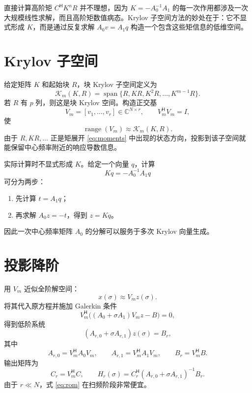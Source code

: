 \documentclass[UTF8,a4paper,11pt]{ctexart}
\newcommand{\CC}{\mathbb{C}}
\newcommand{\cK}{\mathcal{K}}
\newcommand{\herm}{\mathsf{H}}
\begin{document}
直接计算高阶矩 $C^{\herm}K^nR$ 并不理想，因为 $K=-A_0^{-1}A_1$ 的每一次作用都涉及一次大规模线性求解，而且高阶矩数值病态。Krylov 子空间方法的妙处在于：它不显式形成 $K$，而是通过反复求解 $A_0v=A_1q$ 构造一个包含这些矩信息的低维空间。

\section{Krylov 子空间}

给定矩阵 $K$ 和起始块 $R$，块 Krylov 子空间定义为
\begin{equation}
    \cK_m(K,R)
    =
    \operatorname{span}\{R,KR,K^2R,\ldots,K^{m-1}R\}.
    \label{eq:krylov}
\end{equation}
若 $R$ 有 $p$ 列，则这是块 Krylov 空间。构造正交基
\[
    V_m=[v_1,\ldots,v_r]\in\CC^{N\times r},
    \qquad V_m^{\herm}V_m=I,
\]
使
\[
    \operatorname{range}(V_m)\approx \cK_m(K,R).
\]
由于 $R,KR,\ldots$ 正是矩展开 \eqref{eq:moments} 中出现的状态方向，投影到该子空间就能保留中心频率附近的响应导数信息。

实际计算时不显式形成 $K$。给定一个向量 $q$，计算
\[
    Kq=-A_0^{-1}A_1q
\]
可分为两步：
\begin{enumerate}
    \item 先计算 $t=A_1q$；
    \item 再求解 $A_0z=-t$，得到 $z=Kq$。
\end{enumerate}
因此一次中心频率矩阵 $A_0$ 的分解可以服务于多次 Krylov 向量生成。

\section{投影降阶}

用 $V_m$ 近似全阶解空间：
\[
    x(\sigma)\approx V_m z(\sigma).
\]
将其代入原方程并施加 Galerkin 条件
\[
    V_m^{\herm}\bigl((A_0+\sigma A_1)V_mz-B\bigr)=0,
\]
得到低阶系统
\begin{equation}
    (A_{r,0}+\sigma A_{r,1})z(\sigma)=B_r,
    \label{eq:rom}
\end{equation}
其中
\begin{equation}
    A_{r,0}=V_m^{\herm}A_0V_m,\qquad
    A_{r,1}=V_m^{\herm}A_1V_m,\qquad
    B_r=V_m^{\herm}B .
\end{equation}
输出矩阵为
\begin{equation}
    C_r=V_m^{\herm}C,
    \qquad
    H_r(\sigma)=C_r^{\herm}(A_{r,0}+\sigma A_{r,1})^{-1}B_r .
    \label{eq:rom-transfer}
\end{equation}
由于 $r\ll N$，式 \eqref{eq:rom} 在扫频阶段非常便宜。
\end{document}
